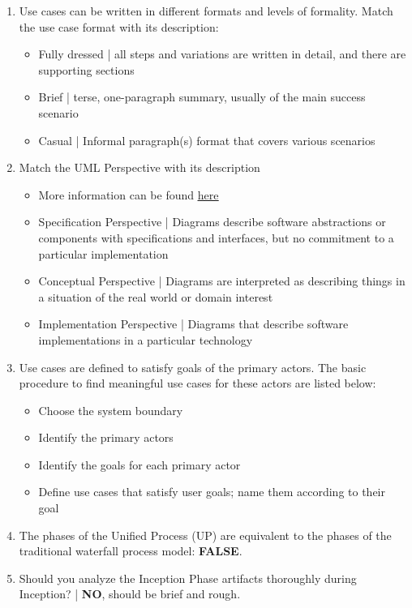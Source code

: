 \documentclass{article}
\begin{document}
\begin{enumerate}
\item Use cases can be written in different formats and levels of formality. Match the use case format with its description:

\begin{itemize}
\item Fully dressed | all steps and variations are written in detail, and there are supporting sections
\item Brief | terse, one-paragraph summary, usually of the main success scenario
\item Casual | Informal paragraph(s) format that covers various scenarios
\end{itemize}

\item Match the UML Perspective with its description

\begin{itemize}
\item More information can be found \href{http://etutorials.org/Programming/UML/Chapter+4.+Class+Diagrams+The+Essentials/Perspectives/}{\underline{here}}
\item Specification Perspective | Diagrams describe software abstractions or components with specifications and interfaces, but no commitment to a particular implementation
\item Conceptual Perspective | Diagrams are interpreted as describing things in a situation of the real world or domain interest
\item Implementation Perspective | Diagrams that describe software implementations in a particular technology
\end{itemize}

\item Use cases are defined to satisfy goals of the primary actors. The basic procedure to find meaningful use cases for these actors are listed below:

\begin{itemize}
\item Choose the system boundary
\item Identify the primary actors
\item Identify the goals for each primary actor
\item Define use cases that satisfy user goals; name them according to their goal
\end{itemize}

\item The phases of the Unified Process (UP) are equivalent to the phases of the traditional waterfall process model: \textbf{FALSE}.
\item Should you analyze the Inception Phase artifacts thoroughly during Inception? |  \textbf{NO}, should be brief and rough.


\end{enumerate}
\end{document}

